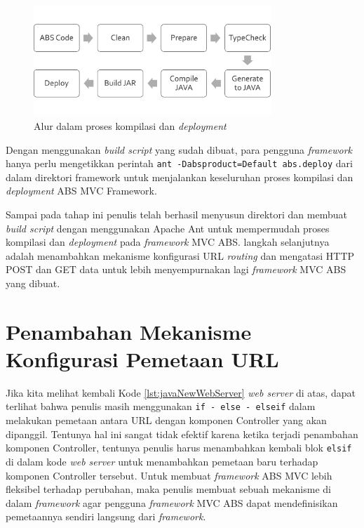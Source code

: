\begin{figure}
    \centering
    \includegraphics[width=0.8\textwidth]{img/build-script-flow.png}
    \caption{Alur dalam proses kompilasi dan \textit{deployment}}
    \label{fig:buildScriptFlow}
\end{figure}

Dengan menggunakan \textit{build script} yang sudah dibuat, para pengguna \textit{framework} hanya perlu mengetikkan perintah \texttt{ant -Dabsproduct=Default abs.deploy} dari dalam direktori framework untuk menjalankan keseluruhan proses kompilasi dan \textit{deployment} ABS MVC Framework.

Sampai pada tahap ini penulis telah berhasil menyusun direktori dan membuat \textit{build script} dengan menggunakan Apache Ant untuk mempermudah proses kompilasi dan \textit{deployment} pada \textit{framework} MVC ABS. langkah selanjutnya adalah menambahkan mekanisme konfigurasi URL \textit{routing} dan mengatasi HTTP POST dan GET data untuk lebih menyempurnakan lagi \textit{framework} MVC ABS yang dibuat.

\section{Penambahan Mekanisme Konfigurasi Pemetaan URL}

Jika kita melihat kembali Kode \ref{lst:javaNewWebServer} \textit{web server} di atas, dapat terlihat bahwa penulis masih menggunakan \texttt{if - else - elseif} dalam melakukan pemetaan antara URL dengan komponen Controller yang akan dipanggil. Tentunya hal ini sangat tidak efektif karena ketika terjadi penambahan komponen Controller, tentunya penulis harus menambahkan kembali blok \texttt{elsif} di dalam kode \textit{web server} untuk menambahkan pemetaan baru terhadap komponen Controller tersebut. Untuk membuat \textit{framework} ABS MVC lebih fleksibel terhadap perubahan, maka penulis membuat sebuah mekanisme di dalam \textit{framework} agar pengguna \textit{framework} MVC ABS dapat mendefinisikan pemetaannya sendiri langsung dari \textit{framework}.\\

